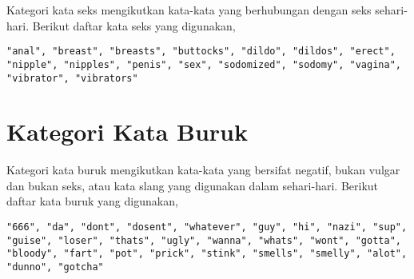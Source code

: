 Kategori kata seks mengikutkan kata-kata yang berhubungan dengan seks
sehari-hari.
Berikut daftar kata seks yang digunakan,

\begin{lstlisting}
"anal", "breast", "breasts", "buttocks", "dildo", "dildos", "erect",
"nipple", "nipples", "penis", "sex", "sodomized", "sodomy", "vagina",
"vibrator", "vibrators"
\end{lstlisting}

\section{Kategori Kata Buruk}
\label{lampiran:words_bad}

Kategori kata buruk mengikutkan kata-kata yang bersifat negatif, bukan vulgar
dan bukan seks, atau kata slang yang digunakan dalam sehari-hari.
Berikut daftar kata buruk yang digunakan,

\begin{lstlisting}
"666", "da", "dont", "dosent", "whatever", "guy", "hi", "nazi", "sup",
"guise", "loser", "thats", "ugly", "wanna", "whats", "wont", "gotta",
"bloody", "fart", "pot", "prick", "stink", "smells", "smelly", "alot",
"dunno", "gotcha"
\end{lstlisting}

